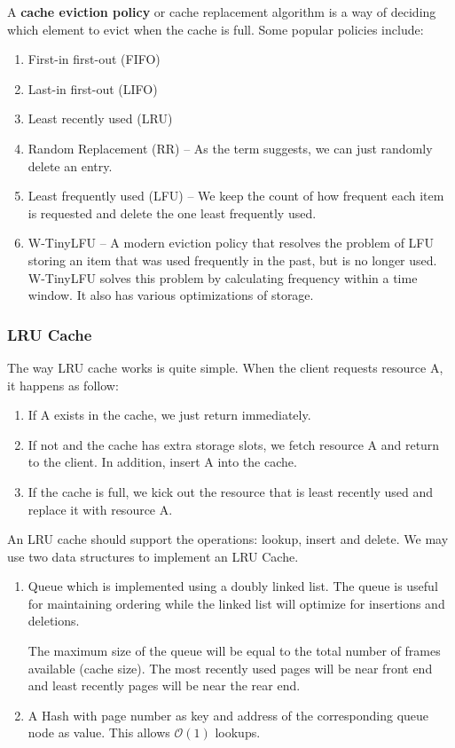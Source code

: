 \documentclass{article}
\begin{document}
    A \textbf{cache eviction policy} or cache replacement algorithm is a way of deciding which element to evict when the cache is full. Some popular policies include:
    \begin{enumerate}
        \item First-in first-out (FIFO)
        \item Last-in first-out (LIFO)
        \item Least recently used (LRU)
        \item  Random Replacement (RR) -- As the term suggests, we can just randomly delete an entry.
        \item Least frequently used (LFU) -- We keep the count of how frequent each item is requested and delete the one least frequently used.
        \item W-TinyLFU -- A modern eviction policy that resolves the problem of LFU storing an item that was used frequently in the past, but is no longer used. W-TinyLFU solves this problem by calculating frequency within a time window. It also has various optimizations of storage.
    \end{enumerate}
    
    \subsubsection{LRU Cache}
    The way LRU cache works is quite simple. When the client requests resource A, it happens as follow:
    
    \begin{enumerate}
        \item If A exists in the cache, we just return immediately.
        \item If not and the cache has extra storage slots, we fetch resource A and return to the client. In addition, insert A into the cache.
        \item  If the cache is full, we kick out the resource that is least recently used and replace it with resource A.
    \end{enumerate}
    
    An LRU cache should support the operations: lookup, insert and delete. We may use two data structures to implement an LRU Cache.
    \begin{enumerate}
        \item Queue which is implemented using a doubly linked list. The queue is useful for maintaining ordering while the linked list will optimize for insertions and deletions.
        
        The maximum size of the queue will be equal to the total number of frames available (cache size). The most recently used pages will be near front end and least recently pages will be near the rear end.
        
        \item A Hash with page number as key and address of the corresponding queue node as value. This allows $\mathcal O(1)$ lookups.
    \end{enumerate}
    
\end{document}
